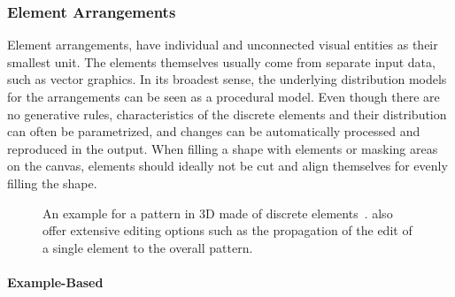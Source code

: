\subsubsection{Element Arrangements}
\label{subsubsec:analysis_element_arrangements}

Element arrangements,  have individual and unconnected visual entities as their smallest unit. The elements themselves usually come from separate input data, such as vector graphics. In its broadest sense, the underlying distribution models for the arrangements can be seen as a procedural model. Even though there are no generative rules, characteristics of the discrete elements and their distribution can often be parametrized, and changes can be automatically processed and reproduced in the output. When filling a shape with elements or masking areas on the canvas, elements should ideally not be cut and align themselves for evenly filling the shape.

\begin{figure}[htb!]
    \centering
    \caption{\label{fig:ma_2011_det}An example for a pattern in 3D made of discrete elements~\cite{ma_2011_det}. \citeauthor*{ma_2011_det} also offer extensive editing options such as the propagation of the edit of a single element to the overall pattern.}
\end{figure}

\paragraph*{Example-Based}
\label{para:analysis_element_arrangements_example}


